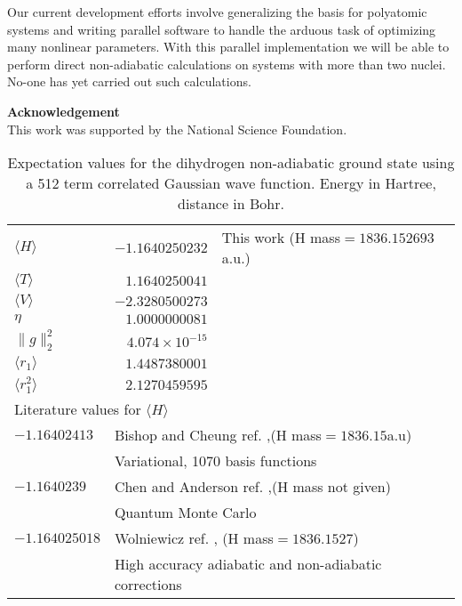 \documentclass[12pt]{article}
\begin{document}
Our current development efforts involve generalizing the basis for 
polyatomic systems and writing parallel software to handle
the arduous task of optimizing many nonlinear parameters. 
With this parallel implementation we will be able to perform
direct non-adiabatic calculations on systems with more than two nuclei.
No-one has yet carried out such calculations.
 

\vspace{.25in}
\noindent
\large{\bf{Acknowledgement}} \normalsize \\
This work was supported by the National Science Foundation.


\begin{table}[!p]
\caption{Expectation values for the dihydrogen non-adiabatic ground state
         using a 512 term correlated {G}aussian wave function.
         Energy in Hartree, distance in Bohr. 
\label{results}}

\begin{tabular}{lrl}
\hline \hline
$\langle H \rangle$ & $-1.1640250232$ & This work (H mass$=1836.152693$a.u.)\\

$\langle T \rangle$ & $ 1.1640250041$  & \\
$\langle V \rangle$ & $-2.3280500273$  & \\
$\eta$              & $ 1.0000000081$  & \\
$\|g\|_{2}^{2}$     & $ 4.074 \times 10^{-15}$  & \\
$\langle r_1 \rangle$ & $ 1.4487380001$                & \\
$\langle r_{1}^{2} \rangle$ & $  2.1270459595$         & \\
\hline
\multicolumn{3}{l}{Literature values for $\langle H \rangle$}\\
\hline
 $-1.16402413$ &\multicolumn{2}{l}{
        Bishop and Cheung ref. \cite{Bishop77b},(H mass$=1836.15$a.u)}\\ 
        &\multicolumn{2}{l}{Variational, 1070 basis functions} \\
 $-1.1640239$ &\multicolumn{2}{l}{
        Chen and Anderson ref. \cite{Chen95},(H mass not given)}\\
        &\multicolumn{2}{l}{Quantum Monte Carlo} \\
 $-1.164025018$ &\multicolumn{2}{l}{
        Wolniewicz ref. \cite{Wolniewicz95}, (H mass$=1836.1527$)}\\
        &\multicolumn{2}{l}{
        High accuracy adiabatic and non-adiabatic corrections}\\
\hline \hline
\end{tabular}
\end{table}
\end{document}
